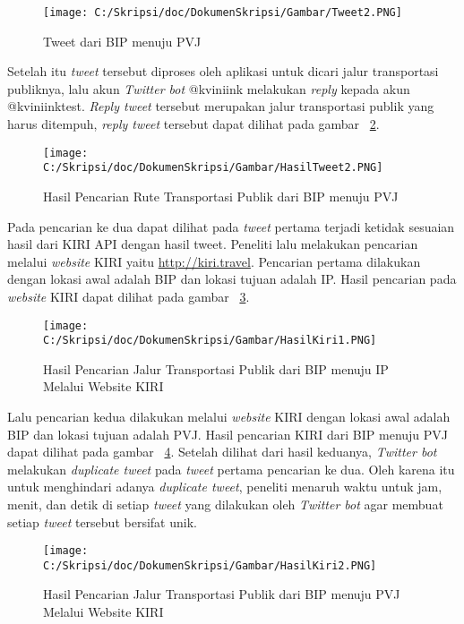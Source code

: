 \begin{enumerate}
	\begin{figure}
		\centering
			\texttt{[image: C:/Skripsi/doc/DokumenSkripsi/Gambar/Tweet2.PNG]}
		\caption{Tweet dari BIP menuju PVJ}
		\label{fig:Tweet2}
	\end{figure}
	
	Setelah itu \textit{tweet} tersebut diproses oleh aplikasi untuk dicari jalur transportasi publiknya, lalu akun \textit{Twitter bot} @kviniink melakukan \textit{reply} kepada akun @kviniinktest. \textit{Reply tweet} tersebut merupakan jalur transportasi publik yang harus ditempuh, \textit{reply tweet} tersebut dapat dilihat pada gambar ~\ref{fig:HasilTweet2}.
	
	
	\begin{figure}
		\centering
			\texttt{[image: C:/Skripsi/doc/DokumenSkripsi/Gambar/HasilTweet2.PNG]}
		\caption{Hasil Pencarian Rute Transportasi Publik dari BIP menuju PVJ}
		\label{fig:HasilTweet2}
	\end{figure}
	
	Pada pencarian ke dua dapat dilihat pada \textit{tweet} pertama terjadi ketidak sesuaian hasil dari KIRI API dengan hasil tweet.
	Peneliti lalu melakukan pencarian melalui \textit{website} KIRI yaitu \url{http://kiri.travel}. Pencarian pertama dilakukan dengan lokasi awal adalah BIP dan lokasi tujuan adalah IP. Hasil pencarian pada \textit{website} KIRI dapat dilihat pada gambar ~\ref{fig:HasilKiri1}.
	
	
	\begin{figure}
		\centering
			\texttt{[image: C:/Skripsi/doc/DokumenSkripsi/Gambar/HasilKiri1.PNG]}
		\caption{Hasil Pencarian Jalur Transportasi Publik dari BIP menuju IP Melalui Website KIRI}
		\label{fig:HasilKiri1}
	\end{figure}
	
	Lalu pencarian kedua dilakukan melalui \textit{website} KIRI dengan lokasi awal adalah BIP dan lokasi tujuan adalah PVJ. Hasil pencarian KIRI dari BIP menuju PVJ dapat dilihat pada gambar ~\ref{fig:HasilKiri2}. Setelah dilihat dari hasil keduanya, \textit{Twitter bot} melakukan \textit{duplicate tweet} pada \textit{tweet} pertama pencarian ke dua. Oleh karena itu untuk menghindari adanya \textit{duplicate tweet}, peneliti menaruh waktu untuk jam, menit, dan detik di setiap \textit{tweet} yang dilakukan oleh \textit{Twitter bot} agar membuat setiap \textit{tweet} tersebut bersifat unik.
	
	\begin{figure}
		\centering
			\texttt{[image: C:/Skripsi/doc/DokumenSkripsi/Gambar/HasilKiri2.PNG]}
		\caption{Hasil Pencarian Jalur Transportasi Publik dari BIP menuju PVJ Melalui Website KIRI}
		\label{fig:HasilKiri2}
	\end{figure}
	\clearpage
	

\end{enumerate}
